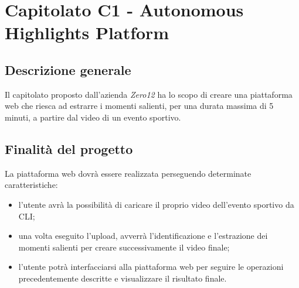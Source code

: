 \section{Capitolato C1 - Autonomous Highlights Platform}

\subsection{Descrizione generale}
Il capitolato proposto dall'azienda \textit{Zero12} ha lo scopo di creare una piattaforma web che riesca ad estrarre i momenti salienti, per una durata massima di 5 minuti, a partire dal video di un evento sportivo.

\subsection{Finalità del progetto}
La piattaforma web dovrà essere realizzata perseguendo determinate caratteristiche:
\begin{itemize}
	\item l'utente avrà la possibilità di caricare il proprio video dell'evento sportivo da CLI\glos;
	\item una volta eseguito l'upload\glos, avverrà l'identificazione e l'estrazione dei momenti salienti per creare successivamente il video finale;
	\item l'utente potrà interfacciarsi alla piattaforma web per seguire le operazioni precedentemente descritte e visualizzare il risultato finale.
\end{itemize}

